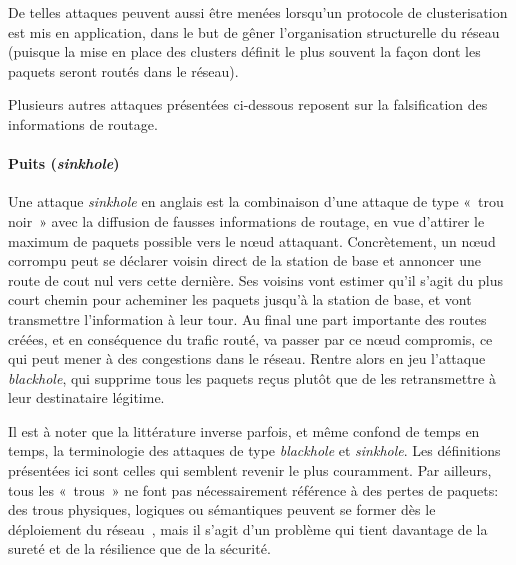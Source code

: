 De telles attaques peuvent aussi être menées lorsqu'un protocole de clusterisation est mis en application, dans le but de gêner l'organisation structurelle du réseau (puisque la mise en place des clusters définit le plus souvent la façon dont les paquets seront routés dans le réseau).

Plusieurs autres attaques présentées ci-dessous reposent sur la falsification des informations de routage.

        \paragraph{Puits (\textit{sinkhole})}
Une attaque \textit{sinkhole} en anglais est la combinaison d'une attaque de type « trou noir » avec la diffusion de fausses informations de routage, en vue d'attirer le maximum de paquets possible vers le nœud attaquant.
Concrètement, un nœud corrompu peut se déclarer voisin direct de la station de base et annoncer une route de cout nul vers cette dernière.
Ses voisins vont estimer qu'il s'agit du plus court chemin pour acheminer les paquets jusqu'à la station de base, et vont transmettre l'information à leur tour.
Au final une part importante des routes créées, et en conséquence du trafic routé, va passer par ce nœud compromis, ce qui peut mener à des congestions dans le réseau.
Rentre alors en jeu l'attaque \textit{blackhole}, qui supprime tous les paquets reçus plutôt que de les retransmettre à leur destinataire légitime.

Il est à noter que la littérature inverse parfois, et même confond de temps en temps, la terminologie des attaques de type \textit{blackhole} et \textit{sinkhole}.
Les définitions présentées ici sont celles qui semblent revenir le plus couramment.
Par ailleurs, tous les « trous » ne font pas nécessairement référence à des pertes de paquets: des trous physiques, logiques ou sémantiques peuvent se former dès le déploiement du réseau~\cite{JSM13}, mais il s'agit d'un problème qui tient davantage de la sureté et de la résilience que de la sécurité.

